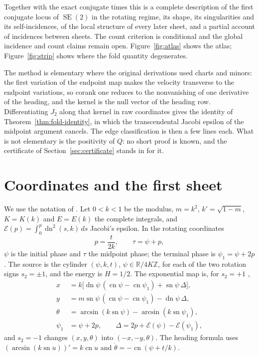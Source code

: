 \documentclass[11pt]{article}
\theoremstyle{remark}
\newcommand{\SE}{\operatorname{SE}(2)}
\newcommand{\sn}{\operatorname{sn}}
\newcommand{\cn}{\operatorname{cn}}
\newcommand{\dn}{\operatorname{dn}}
\newcommand{\epsi}{\mathcal{E}}
\begin{document}
Together with the exact conjugate times this is a complete description
of the first conjugate locus of $\SE$ in the rotating regime, its shape,
its singularities and its self-incidences, of the local structure of
every later sheet, and a partial account of incidences between sheets.
The count criterion is conditional and the global incidence and count
claims remain open.  Figure~\ref{fig:atlas} shows the atlas;
Figure~\ref{fig:strip} shows where the fold quantity degenerates.

The method is elementary where the original derivations used charts and
minors: the first variation of the endpoint map makes the
velocity transverse to the endpoint variations, so corank one reduces to
the nonvanishing of one derivative of the heading, and the kernel is the
null vector of the heading row.  Differentiating $J_2$ along that kernel
in raw coordinates gives the identity of Theorem~\ref{thm:fold-identity},
in which the transcendental Jacobi epsilon of the midpoint argument
cancels.  The edge classification is then a few lines each.  What is not
elementary is the positivity of $Q$: no short proof is known, and the
certificate of Section~\ref{sec:certificate} stands in for it.

\section{Coordinates and the first sheet}\label{sec:coordinates}

We use the notation of \cite{SE2FirstConjugate}.  Let $0<k<1$ be the
modulus, $m=k^2$, $k'=\sqrt{1-m}$, $K=K(k)$ and $E=E(k)$ the complete
integrals, and $\epsi(p)=\int_0^p\dn^2(s,k)\,ds$ Jacobi's epsilon.  In the
rotating coordinates
\begin{equation}\label{eq:coordinates}
 p=\frac t{2k},\qquad \tau=\psi+p,
\end{equation}
$\psi$ is the initial phase and $\tau$ the midpoint phase;
the terminal phase is $\psi_1=\psi+2p$. The source is
the cylinder $(\psi,k,t)$, $\psi\in\mathbb R/4K\mathbb Z$, for each of the two
rotation signs $s_2=\pm1$, and the energy is $H=1/2$.  The exponential map
is, for $s_2=+1$ \cite[Section 4.3]{MoiseevSachkov2010Maxwell},
\begin{equation}\label{eq:exp}
 \begin{aligned}
 x&=k\bigl[\dn\psi\,(\cn\psi-\cn\psi_1)+\sn\psi\,\Delta\bigr],\\
 y&=m\sn\psi\,(\cn\psi-\cn\psi_1)-\dn\psi\,\Delta,\\
 \theta&=\arcsin(k\sn\psi)-\arcsin(k\sn\psi_1),\\
 \psi_1&=\psi+2p,\qquad \Delta=2p+\epsi(\psi)-\epsi(\psi_1),
 \end{aligned}
\end{equation}
and $s_2=-1$ changes $(x,y,\theta)$ into $(-x,-y,\theta)$.  The heading
formula uses $(\arcsin(k\sn u))'=k\cn u$ and $\dot\theta=-\cn(\psi+t/k)$.
\end{document}
